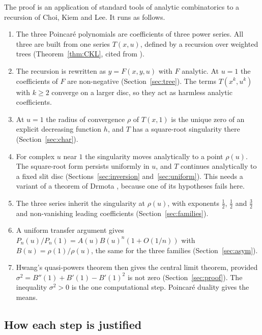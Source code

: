 \documentclass[11pt]{amsart}
\theoremstyle{definition}
\theoremstyle{remark}
\numberwithin{equation}{section}
\begin{document}
The proof is an application of standard tools of analytic combinatorics to a recursion of Choi, Kiem and Lee. It runs as follows.
\begin{enumerate}
\item The three Poincar\'e polynomials are coefficients of three power series. All three are built from one series \(T(x,u)\), defined by a recursion over weighted trees (Theorem~\ref{thm:CKL}, cited from \cite{CKL,CK}).
\item The recursion is rewritten as \(y=F(x,y,u)\) with \(F\) analytic. At \(u=1\) the coefficients of \(F\) are non-negative (Section~\ref{sec:tree}). The terms \(T(x^k,u^k)\) with \(k\ge2\) converge on a larger disc, so they act as harmless analytic coefficients.
\item At \(u=1\) the radius of convergence \(\rho\) of \(T(x,1)\) is the unique zero of an explicit decreasing function \(h\), and \(T\) has a square-root singularity there (Section~\ref{sec:char}).
\item For complex \(u\) near \(1\) the singularity moves analytically to a point \(\rho(u)\). The square-root form persists uniformly in \(u\), and \(T\) continues analytically to a fixed slit disc (Sections~\ref{sec:inversion} and~\ref{sec:uniform}). This needs a variant of a theorem of Drmota \cite[Thm.~2.21]{Dr}, because one of its hypotheses fails here.
\item The three series inherit the singularity at \(\rho(u)\), with exponents \(\frac12\), \(\frac12\) and \(\frac32\) and non-vanishing leading coefficients (Section~\ref{sec:families}).
\item A uniform transfer argument gives \(P_n(u)/P_n(1)=A(u)B(u)^n(1+O(1/n))\) with \(B(u)=\rho(1)/\rho(u)\), the same for the three families (Section~\ref{sec:asym}).
\item Hwang's quasi-powers theorem then gives the central limit theorem, provided \(\sigma^2=B''(1)+B'(1)-B'(1)^2\) is not zero (Section~\ref{sec:proof}). The inequality \(\sigma^2>0\) is the one computational step. Poincar\'e duality gives the means.
\end{enumerate}

\subsection{How each step is justified}
\end{document}

